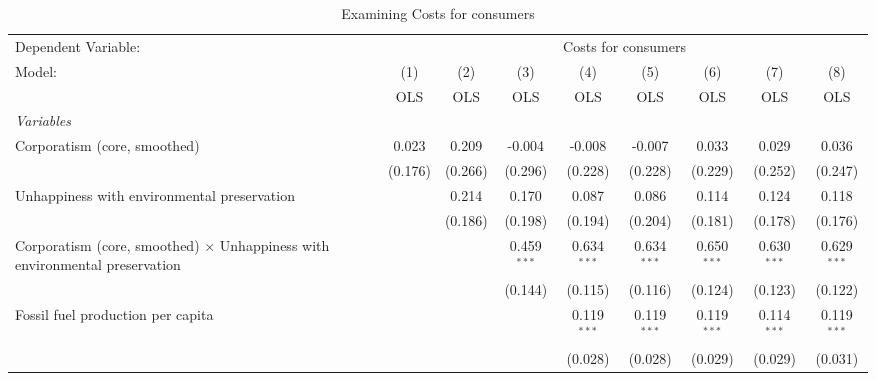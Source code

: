 
\begin{table}[htbp]
   \caption{Examining Costs for consumers}
   \centering
   \begin{tabular}{lcccccccc}
      \toprule
      Dependent Variable: & \multicolumn{8}{c}{Costs for consumers}\\
      Model:                                                                             & (1)     & (2)     & (3)           & (4)           & (5)           & (6)           & (7)           & (8)\\  
                                                                                         &  OLS    & OLS     & OLS           & OLS           & OLS           & OLS           & OLS           & OLS\\  
      \midrule
      \emph{Variables}\\
      Corporatism (core, smoothed)                                                       & 0.023   & 0.209   & -0.004        & -0.008        & -0.007        & 0.033         & 0.029         & 0.036\\   
                                                                                         & (0.176) & (0.266) & (0.296)       & (0.228)       & (0.228)       & (0.229)       & (0.252)       & (0.247)\\   
      Unhappiness with environmental preservation                                        &         & 0.214   & 0.170         & 0.087         & 0.086         & 0.114         & 0.124         & 0.118\\   
                                                                                         &         & (0.186) & (0.198)       & (0.194)       & (0.204)       & (0.181)       & (0.178)       & (0.176)\\   
      Corporatism (core, smoothed) $\times$ Unhappiness with environmental preservation  &         &         & 0.459$^{***}$ & 0.634$^{***}$ & 0.634$^{***}$ & 0.650$^{***}$ & 0.630$^{***}$ & 0.629$^{***}$\\   
                                                                                         &         &         & (0.144)       & (0.115)       & (0.116)       & (0.124)       & (0.123)       & (0.122)\\   
      Fossil fuel production per capita                                                  &         &         &               & 0.119$^{***}$ & 0.119$^{***}$ & 0.119$^{***}$ & 0.114$^{***}$ & 0.119$^{***}$\\   
                                                                                         &         &         &               & (0.028)       & (0.028)       & (0.029)       & (0.029)       & (0.031)\\   

\end{tabular}
\end{table}

